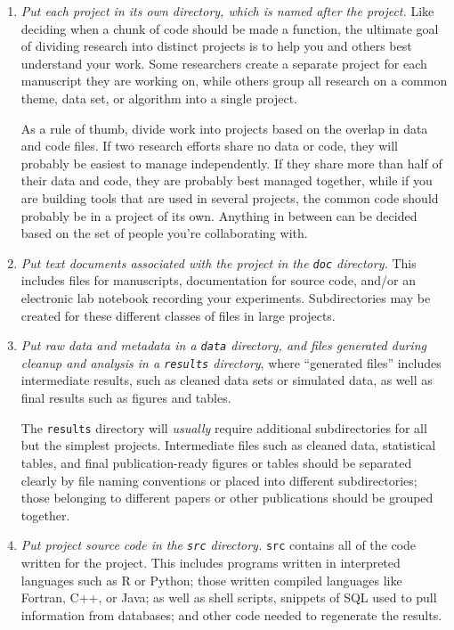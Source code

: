 \documentclass[10pt]{article}
\newcommand{\recommend}[1]{\textit{#1}}
\begin{document}
\begin{enumerate}

\item
  \recommend{Put each project in its own directory, which is named
    after the project.}  Like deciding when a chunk of code should be
  made a function, the ultimate goal of dividing research into
  distinct projects is to help you and others best understand your
  work. Some researchers create a separate project for each manuscript
  they are working on, while others group all research on a common
  theme, data set, or algorithm into a single project.

  As a rule of thumb, divide work into projects based on the overlap
  in data and code files. If two research efforts share no data or
  code, they will probably be easiest to manage independently. If they
  share more than half of their data and code, they are probably best
  managed together, while if you are building tools that are used in
  several projects, the common code should probably be in a project of
  its own. Anything in between can be decided based on the set of
  people you're collaborating with.

\item
  \recommend{Put text documents associated with the project in the
    \texttt{doc} directory.} This includes files for manuscripts,
  documentation for source code, and/or an electronic lab notebook
  recording your experiments.  Subdirectories may be created for these
  different classes of files in large projects.

\item
  \recommend{Put raw data and metadata in a \texttt{data} directory,
    and files generated during cleanup and analysis in a
    \texttt{results} directory}, where ``generated files'' includes
  intermediate results, such as cleaned data sets or simulated data,
  as well as final results such as figures and tables.

  The \texttt{results} directory will \emph{usually}
  require additional subdirectories for all but the simplest
  projects. Intermediate files such as cleaned data, statistical
  tables, and final publication-ready figures or tables should be
  separated clearly by file naming conventions or placed into
  different subdirectories; those belonging to different papers or
  other publications should be grouped together.

\item
  \recommend{Put project source code in the \texttt{src} directory.}
  \texttt{src} contains all of the code written for the project. This includes 
  programs written in interpreted languages
  such as R or Python; those written compiled languages like
  Fortran, C++, or Java; as well as shell scripts, snippets of SQL used to pull
  information from databases; and other code needed to regenerate
  the results. 


\end{enumerate}
\end{document}
